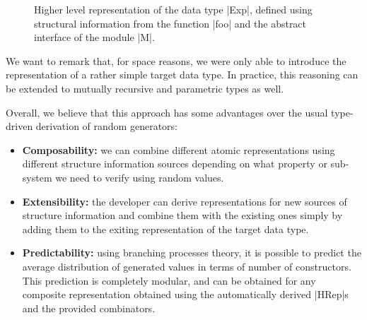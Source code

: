 \begin{figure}[t]
  \centering
  
  \caption{Higher level representation of the data type |Exp|, defined using
    structural information from the function |foo| and the abstract interface of
    the module |M|.}
  \label{fig:hrep}
\end{figure}


We want to remark that, for space reasons, we were only able to introduce the
representation of a rather simple target data type.
%
In practice, this reasoning can be extended to mutually recursive and parametric
types as well.


Overall, we believe that this approach has some advantages over the usual
type-driven derivation of random generators:
%
\begin{itemize}
\item \textbf{Composability:} we can combine different atomic representations
  using different structure information sources depending on what property or
  sub-system we need to verify using random values.
\item \textbf{Extensibility:} the developer can derive representations for new
  sources of structure information and combine them with the existing ones
  simply by adding them to the exiting representation of the target data type.
\item \textbf{Predictability:} using branching processes theory, it is possible
  to predict the average distribution of generated values in terms of number of
  constructors.
  This prediction is completely modular, and can be obtained for any composite
  representation obtained using the automatically derived |HRep|s and the
  provided combinators.
\end{itemize}




%
%


